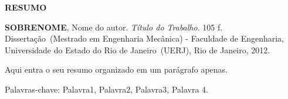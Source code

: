 \begin{center}
\textbf{RESUMO}
\end{center}

%
%

$\!$\\

\hspace{-1.3cm}\textbf{SOBRENOME}, Nome do autor. \textit{Título do Trabalho}. 105 f. Dissertação~(Mestrado em Engenharia Mecânica) - Faculdade de Engenharia, Universidade do Estado do Rio de Janeiro~(UERJ), Rio de Janeiro, 2012.

\vspace{.2cm}

Aqui entra o seu resumo organizado em um parágrafo apenas.

\vspace{1cm}

\hspace{-1.3cm}Palavras-chave: Palavra1, Palavra2, Palavra3, Palavra 4.